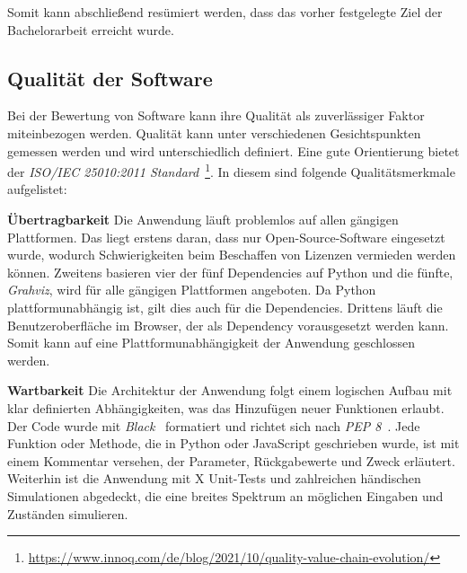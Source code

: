 Somit kann abschließend resümiert werden, dass das vorher festgelegte Ziel der Bachelorarbeit erreicht wurde.























\subsection{Qualität der Software}\label{softwarequalität}

Bei der Bewertung von Software kann ihre Qualität als zuverlässiger Faktor miteinbezogen werden. Qualität kann unter verschiedenen Gesichtspunkten gemessen werden und wird
unterschiedlich definiert. Eine gute Orientierung bietet der \textit{ISO/IEC 25010:2011 Standard}~\footnote{\hspace{1.5mm}\url{https://www.innoq.com/de/blog/2021/10/quality-value-chain-evolution/}}. 
In diesem sind folgende Qualitätsmerkmale aufgelistet:

\noindent\textbf{Übertragbarkeit} Die Anwendung läuft problemlos auf allen gängigen Plattformen. Das liegt erstens daran, dass nur Open-Source-Software eingesetzt wurde,
wodurch Schwierigkeiten beim Beschaffen von Lizenzen vermieden werden können. 
Zweitens basieren vier der fünf Dependencies auf Python und die fünfte, \textit{Grahviz}, wird für alle gängigen Plattformen angeboten. Da Python plattformunabhängig ist, gilt dies auch
für die Dependencies.
Drittens läuft die Benutzeroberfläche im Browser, der als Dependency vorausgesetzt werden kann.
Somit kann auf eine Plattformunabhängigkeit der Anwendung geschlossen werden.

\noindent\textbf{Wartbarkeit} Die Architektur der Anwendung folgt einem logischen Aufbau mit klar definierten Abhängigkeiten, was das Hinzufügen neuer Funktionen erlaubt.
Der Code wurde mit \textit{Black}~\cite{black} formatiert und richtet sich nach \textit{PEP 8}~\cite{pep}. Jede Funktion oder Methode, die in Python oder JavaScript geschrieben wurde, 
ist mit einem Kommentar versehen, der Parameter, Rückgabewerte und Zweck erläutert. Weiterhin ist die Anwendung mit X Unit-Tests und zahlreichen händischen Simulationen abgedeckt, die eine breites Spektrum an 
möglichen Eingaben und Zuständen simulieren.

